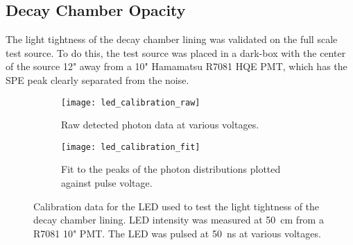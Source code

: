 \subsection{Decay Chamber Opacity}
\label{sec:liningtest}
The light tightness of the decay chamber lining was validated on the full scale test source. 
To do this, the test source was placed in a dark-box with the center of the source 12" away from a 10" Hamamatsu R7081 HQE PMT, which has the SPE peak clearly separated from the noise. 
\begin{figure}
        \begin{subfigure}{0.49\textwidth}
                \texttt{[image: led\_calibration\_raw]}
                \caption{Raw detected photon data at various voltages.}
                \label{fig:ledRAW}
        \end{subfigure}%
        \hspace{0.2cm}
        \begin{subfigure}{0.49\textwidth}
                \texttt{[image: led\_calibration\_fit]}
                \caption{Fit to the peaks of the photon distributions plotted against pulse voltage.}
                \label{fig:ledFit}
        \end{subfigure}
        \caption{Calibration data for the LED used to test the light tightness of the decay chamber lining. LED intensity was measured at 50~cm from a R7081 10" PMT. The LED was pulsed at 50~ns at various voltages.}
\label{fig:calibratedled1}
\end{figure}

